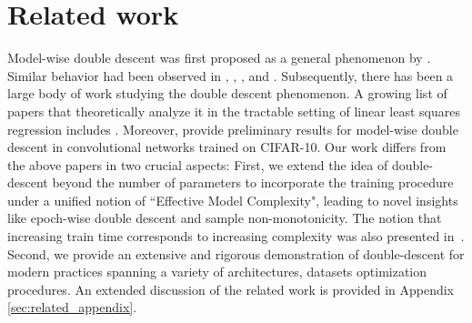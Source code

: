 \section{Related work}
Model-wise double descent was first proposed as a general phenomenon
by \cite{belkin2018reconciling}.
Similar behavior had been observed in
\cite{opper1995statistical, opper2001learning},
\cite{advani2017high},
\cite{spigler2018jamming}, and \cite{geiger2019jamming}.
Subsequently, there has been a large body of work studying the double descent phenomenon.
A growing list of papers that theoretically analyze it in the tractable setting of linear least squares regression includes \cite{belkin2019two, hastie2019surprises, bartlett2019benign, muthukumar2019harmless, bibas2019new, Mitra2019UnderstandingOP, mei2019generalization}. Moreover, \cite{geiger2019scaling} provide preliminary results for model-wise double descent in convolutional networks trained on CIFAR-10. Our work differs from the above papers in two crucial aspects: First, we extend the idea of double-descent beyond the number of parameters to incorporate the training procedure under a unified notion of ``Effective Model Complexity", leading to novel insights like epoch-wise double descent and sample non-monotonicity.
The notion that increasing train time corresponds to
increasing complexity was also presented in~\cite{nakkiran2019sgd}.
Second, we provide an extensive
and rigorous demonstration of double-descent for modern practices spanning a variety of architectures, datasets optimization procedures.
An extended discussion of the related work is provided in Appendix \ref{sec:related_appendix}.


